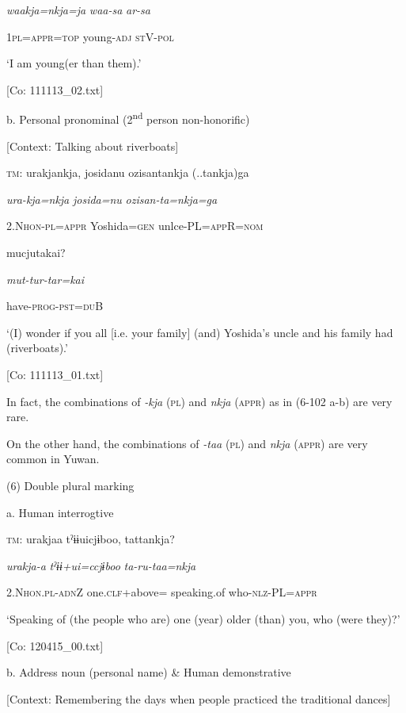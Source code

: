       \textit{waakja=nkja=ja}  \textit{waa-sa}  \textit{ar-sa}

      1\textsc{pl}=\textsc{appr}=\textsc{top}  young-\textsc{adj}  \textsc{st}V-\textsc{pol}

      ‘I am young(er than them).’

      [Co: 111113\_02.txt]

  b.  Personal pronominal (2\textsuperscript{nd} person non-honorific)

    [Context: Talking about riverboats]

    \textsc{tm}:  urakjankja,  josidanu  ozisantankja (..tankja)ga

      \textit{ura-kja=nkja}  \textit{josida=nu}  \textit{ozisan-ta=nkja=ga}

      2.N\textsc{hon}-\textsc{pl}=\textsc{appr}  Yoshida=\textsc{gen}  unlce-PL=\textsc{app}R=\textsc{nom}

      mucjutakai?

      \textit{mut-tur-tar=kai}

      have-\textsc{prog}-\textsc{pst}=\textsc{du}B

      ‘(I) wonder if you all [i.e. your family] (and) Yoshida’s uncle and his family had (riverboats).’

      [Co: 111113\_01.txt]

In fact, the combinations of \textit{{}-kja} (\textsc{pl}) and \textit{nkja} (\textsc{appr}) as in (6-102 a-b) are very rare.

On the other hand, the combinations of \textit{{}-taa} (\textsc{pl}) and \textit{nkja} (\textsc{appr}) are very common in Yuwan.

(6)  Double plural marking

  a.  Human interrogtive

    \textsc{tm}:  urakjaa  tˀɨɨuicjɨboo,  tattankja?

      \textit{urakja-a}  \textit{tˀɨɨ+ui=ccjɨboo}  \textit{ta-ru-taa=nkja}

      2.N\textsc{hon}.\textsc{pl}-\textsc{adn}Z  one.\textsc{clf}+above= speaking.of  who-\textsc{nlz}-PL=\textsc{appr}

      ‘Speaking of (the people who are) one (year) older (than) you, who (were they)?’

      [Co: 120415\_00.txt]

  b.  Address noun (personal name) \& Human demonstrative

    [Context: Remembering the days when people practiced the traditional dances]

